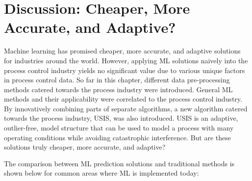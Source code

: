 \section{Discussion: Cheaper, More Accurate, and Adaptive?}

Machine learning has promised cheaper, more accurate, and adaptive solutions for industries around the world.  However, applying ML solutions naively into the process control industry yields no significant value due to various unique factors in process control data.  So far in this chapter, different data pre-processing methods catered towards the process industry were introduced.  General ML methods and their applicability were correlated to the process control industry. By innovatively combining parts of separate algorithms, a new algorithm catered towards the process industry, USIS, was also introduced. USIS is an adaptive, outlier-free, model structure that can be used to model a process with many operating conditions while avoiding catastrophic interference. But are these solutions truly cheaper, more accurate, and adaptive? 

The comparison between ML prediction solutions and traditional methods is shown below for common areas where ML is implemented today:

